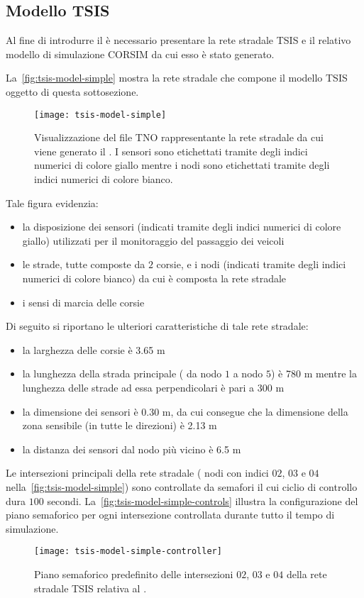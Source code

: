 \subsection{Modello TSIS}\label{subsec:tsis-simple-model}
Al fine di introdurre il  è necessario presentare la rete stradale \acs{TSIS} e il relativo modello di simulazione \acs{CORSIM} da cui esso è stato generato.

La~\vref{fig:tsis-model-simple} mostra la rete stradale che compone il modello \acs{TSIS} oggetto di questa sottosezione.
\begin{figure}[H]
  	\centering
  	\texttt{[image: tsis-model-simple]}%
  	\caption[Rete stradale relativa al ]{Visualizzazione del file \acs{TNO} rappresentante la rete stradale da cui viene generato il . I sensori sono etichettati tramite degli indici numerici di colore giallo mentre i nodi sono etichettati tramite degli indici numerici di colore bianco.}
	\label{fig:tsis-model-simple}
\end{figure}
Tale figura evidenzia:
\begin{itemize}
	\item la disposizione dei sensori (indicati tramite degli indici numerici di colore giallo) utilizzati per il monitoraggio del passaggio dei veicoli
	\item le strade, tutte composte da $2$ corsie, e i nodi (indicati tramite degli indici numerici di colore bianco) da cui è composta la rete stradale
	\item i sensi di marcia delle corsie
\end{itemize}
Di seguito si riportano le ulteriori caratteristiche di tale rete stradale:
\begin{itemize}
	\item la larghezza delle corsie è \num{3.65} \si{\metre}
	\item la lunghezza della strada principale (\ie{} da nodo $1$ a nodo $5$) è \num{780} \si{\metre} mentre la lunghezza delle strade ad essa perpendicolari è pari a \num{300} \si{\metre}
	\item la dimensione dei sensori è \num{0.30} \si{\metre}, da cui consegue che la dimensione della zona sensibile (in tutte le direzioni) è \num{2.13} \si{\metre}
	\item la distanza dei sensori dal nodo più vicino è \num{6.5} \si{\metre}
\end{itemize}

Le intersezioni principali della rete stradale (\ie{} nodi con indici $02$, $03$ e $04$ nella~\vref{fig:tsis-model-simple}) sono controllate da semafori il cui ciclio di controllo dura $100$ secondi. La~\vref{fig:tsis-model-simple-controls} illustra la configurazione del piano semaforico per ogni intersezione controllata durante tutto il tempo di simulazione.
\begin{figure}[H]
	\centering
	\texttt{[image: tsis-model-simple-controller]}
	\caption[Piano semaforico relativo al ]{Piano semaforico predefinito delle intersezioni $02$, $03$ e $04$ della rete stradale \acs{TSIS} relativa al .}
	\label{fig:tsis-model-simple-controls}
\end{figure}

